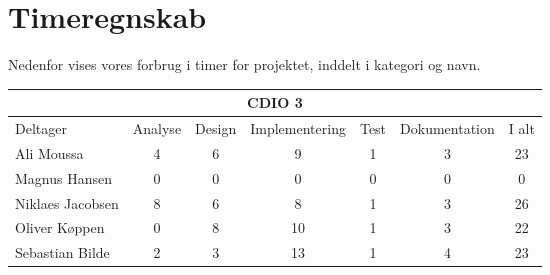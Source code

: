 \chapter*{Timeregnskab}

Nedenfor vises vores forbrug i timer for projektet, inddelt i kategori og navn.

\begin{table}[h]
    \centering
        \begin{tabular}{|l|c|c|c|c|c|c|}
                \hline
            \multicolumn{7}{|c|}{CDIO 3}
            \\ \hline
                    Deltager         &  Analyse  &  Design  &  Implementering  &  Test  &  Dokumentation  &  I alt
            \\ \hline
                    Ali Moussa       &    4      &    6     &        9         &    1   &        3        &    23
            \\ \hline
                    Magnus Hansen    &    0      &    0     &        0         &    0   &        0        &    0
            \\ \hline
                    Niklaes Jacobsen &    8      &    6     &        8         &    1   &        3        &    26
            \\ \hline
                    Oliver Køppen    &    0      &    8     &        10        &    1   &        3        &    22
            \\ \hline
                    Sebastian Bilde  &    2      &    3     &        13         &    1   &        4        &   23
            \\ \hline
        \end{tabular}
\end{table}